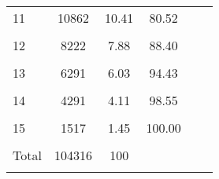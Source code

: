\begin{table}
\begin{tabular}{l*{5}{c}}
    11          &       10862  & 10.41   &    80.52      \\
                &                     \\
    
    12          &        8222    &7.88    &   88.40     \\
                &                     \\
    
    13          &        6291  &6.03  &     94.43       \\
                &                     \\
    
    14          &        4291  &  4.11  &     98.55     \\
                &                     \\
    
    15          &        1517   & 1.45 &     100.00      \\
                &                     \\
    \hline
    Total       &      104316   &100      \\
                &                     \\
    
    
    \end{tabular}
    \end{table}